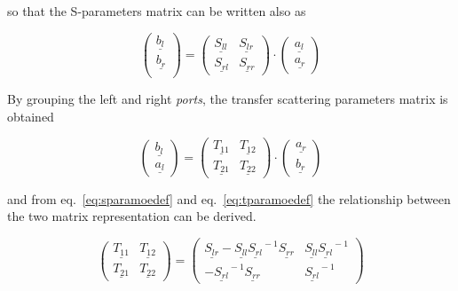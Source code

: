 so that the S-parameters matrix can be written also as

\begin{equation}
\label{eq:sparamoedef}
\begin{pmatrix}
\underline{b_l}\\
\underline{b_r}\\
\end{pmatrix}
=
\begin{pmatrix}
\underline{S_{ll}} & \underline{S_{lr}}\\
\underline{S_{rl}} & \underline{S_{rr}}
\end{pmatrix}
\cdot
\begin{pmatrix}
\underline{a_l}\\
\underline{a_r}
\end{pmatrix}
\end{equation}

By grouping the left and right \textit{ports}, the transfer scattering parameters matrix is obtained

\begin{equation}
\label{eq:tparamoedef}
\begin{pmatrix}
\underline{b_l}\\
\underline{a_l}
\end{pmatrix}
=
\begin{pmatrix}
\underline{T_{11}} & \underline{T_{12}}\\
\underline{T_{21}} & \underline{T_{22}}
\end{pmatrix}
\cdot
\begin{pmatrix}
\underline{a_r}\\
\underline{b_r}
\end{pmatrix}
\end{equation}

and from eq.~\eqref{eq:sparamoedef} and eq.~\eqref{eq:tparamoedef} the relationship between the two matrix representation can be derived.

\begin{equation}
\label{eq:toesoe}
\begin{pmatrix}
\underline{T_{11}} & \underline{T_{12}}\\
\underline{T_{21}} & \underline{T_{22}}
\end{pmatrix}
=
\begin{pmatrix}
\underline{S_{lr}} - \underline{S_{ll}}\underline{S_{rl}}^{\!\!\!\!-1}\underline{S_{rr}} & \underline{S_{ll}}\underline{S_{rl}}^{\!\!\!\!-1}\\
- \underline{S_{rl}}^{\!\!\!\!-1}\underline{S_{rr}} & \underline{S_{rl}}^{\!\!\!\!-1}
\end{pmatrix}
\end{equation}

